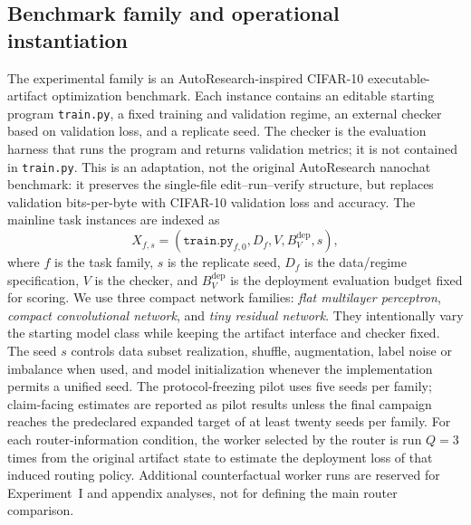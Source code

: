 \documentclass{article}
\begin{document}
\subsection{Benchmark family and operational instantiation}
\label{subsec:benchmark}

The experimental family is an AutoResearch-inspired CIFAR-10 executable-artifact optimization benchmark.
Each instance contains an editable starting program \texttt{train.py}, a fixed training and validation regime, an external checker based on validation loss, and a replicate seed.
The checker is the evaluation harness that runs the program and returns validation metrics; it is not contained in \texttt{train.py}.
This is an adaptation, not the original AutoResearch nanochat benchmark: it preserves the single-file edit--run--verify structure, but replaces validation bits-per-byte with CIFAR-10 validation loss and accuracy.
The mainline task instances are indexed as
\[
X_{f,s}=(\texttt{train.py}_{f,0},D_f,V,B_V^{\mathrm{dep}},s),
\]
where $f$ is the task family, $s$ is the replicate seed, $D_f$ is the data/regime specification, $V$ is the checker, and $B_V^{\mathrm{dep}}$ is the deployment evaluation budget fixed for scoring.
We use three compact network families: \emph{flat multilayer perceptron}, \emph{compact convolutional network}, and \emph{tiny residual network}.
They intentionally vary the starting model class while keeping the artifact interface and checker fixed.
The seed $s$ controls data subset realization, shuffle, augmentation, label noise or imbalance when used, and model initialization whenever the implementation permits a unified seed.
The protocol-freezing pilot uses five seeds per family; claim-facing estimates are reported as pilot results unless the final campaign reaches the predeclared expanded target of at least twenty seeds per family.
For each router-information condition, the worker selected by the router is run $Q=3$ times from the original artifact state to estimate the deployment loss of that induced routing policy.
Additional counterfactual worker runs are reserved for Experiment~I and appendix analyses, not for defining the main router comparison.
\end{document}
